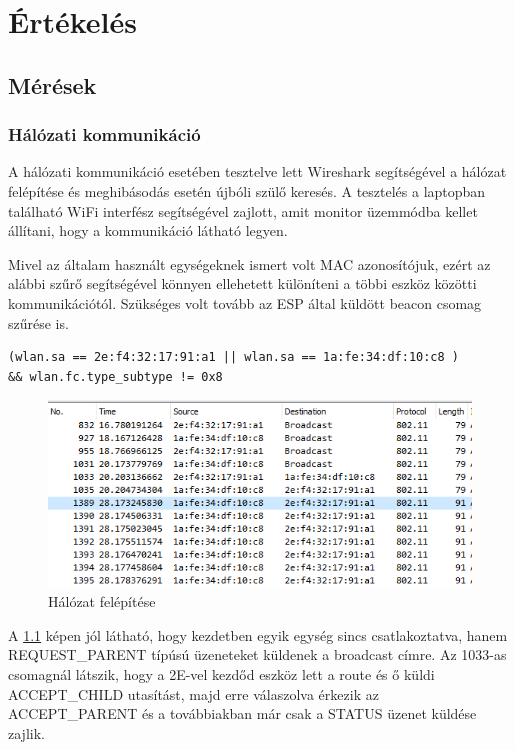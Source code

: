 \chapter{Értékelés}

\section{Mérések}

\subsection{Hálózati kommunikáció}
A hálózati kommunikáció esetében tesztelve lett Wireshark segítségével a hálózat felépítése és meghibásodás esetén újbóli szülő keresés. A tesztelés a laptopban található WiFi interfész segítségével zajlott, amit monitor üzemmódba kellet állítani, hogy a kommunikáció látható legyen.

Mivel az általam használt egységeknek ismert volt MAC azonosítójuk, ezért az alábbi szűrő segítségével könnyen ellehetett különíteni a többi eszköz közötti kommunikációtól. Szükséges volt tovább az ESP által küldött beacon csomag szűrése is.

\begin{verbatim} 
(wlan.sa == 2e:f4:32:17:91:a1 || wlan.sa == 1a:fe:34:df:10:c8 )
&& wlan.fc.type_subtype != 0x8  
\end{verbatim}


\begin{figure}[!ht]
    \centering
    \includegraphics[width=150mm, keepaspectratio]{figures/wireshark_buildup.png}
    \caption{Hálózat felépítése}
    \label{fig:network_buildup}
\end{figure}

A \ref{fig:network_buildup} képen jól látható, hogy kezdetben egyik egység sincs csatlakoztatva, hanem REQUEST\_PARENT típúsú üzeneteket küldenek a broadcast címre. Az 1033-as csomagnál látszik, hogy a 2E-vel kezdőd eszköz lett a route és ő küldi ACCEPT\_CHILD utasítást, majd erre válaszolva érkezik az ACCEPT\_PARENT és a továbbiakban már csak a STATUS üzenet küldése zajlik.

